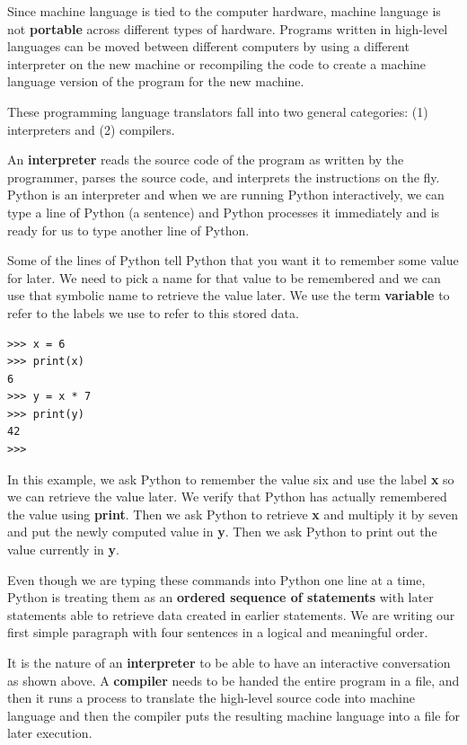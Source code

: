 Since machine language is tied to the computer hardware, machine language
is not {\bf portable} across different types of hardware.  Programs written in 
high-level languages can be moved between different computers by using a 
different interpreter on the new machine or recompiling the code to create
a machine language version of the program for the new machine.

These programming language translators fall into two general categories:
(1) interpreters and (2) compilers.

An {\bf interpreter} reads the source code of the program as written by the
programmer, parses the source code, and interprets the instructions on the fly.
Python is an interpreter and when we are running Python interactively, 
we can type a line of Python (a sentence) and Python processes it immediately
and is ready for us to type another line of Python.   

Some of the lines of Python tell Python that you want it to remember some 
value for later.   We need to pick a name for that value to be remembered and
we can use that symbolic name to retrieve the value later.  We use the 
term {\bf variable} to refer to the labels we use to refer to this stored data.

\beforeverb
\begin{verbatim}
>>> x = 6
>>> print(x)
6
>>> y = x * 7
>>> print(y)
42
>>> 
\end{verbatim}
\afterverb
%
In this example, we ask Python to remember the value six and use the label {\bf x}
so we can retrieve the value later.   We verify that Python has actually remembered
the value using {\bf print}. Then we ask Python to retrieve {\bf x} and multiply
it by seven and put the newly computed value in {\bf y}.  Then we ask Python to print out
the value currently in {\bf y}.

Even though we are typing these commands into Python one line at a time, Python
is treating them as an {\bf ordered sequence of statements} with later statements able
to retrieve data created in earlier statements.   We are writing our first 
simple paragraph with four sentences in a logical and meaningful order.

It is the nature of an {\bf interpreter} to be able to have an interactive conversation
as shown above.  A {\bf compiler} needs to be handed the entire program in a file, and then 
it runs a process to translate the high-level source code into machine language
and then the compiler puts the resulting machine language into a file for later
execution.

